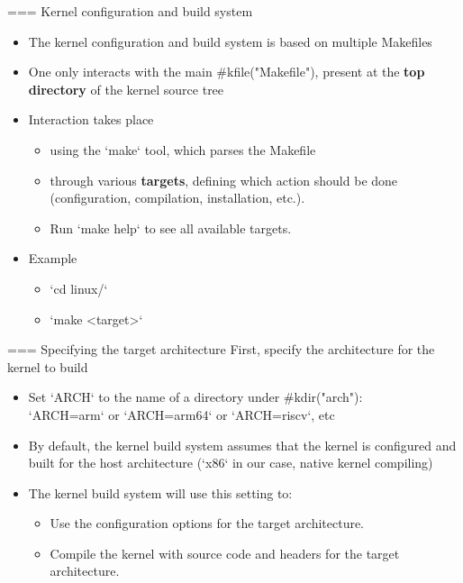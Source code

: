 === Kernel configuration and build system
  \begin{itemize}
  \item The kernel configuration and build system is based on multiple
    Makefiles
  \item One only interacts with the main #kfile("Makefile"), present at
    the {\bf top directory} of the kernel source tree
  \item Interaction takes place
    \begin{itemize}
    \item using the `make` tool, which parses the Makefile
    \item through various {\bf targets}, defining which action should
      be done (configuration, compilation, installation, etc.).
    \item Run `make help` to see all available targets.
    \end{itemize}
  \item Example
    \begin{itemize}
    \item `cd linux/`
    \item `make <target>`
    \end{itemize}
  \end{itemize}


=== Specifying the target architecture
  First, specify the architecture for the kernel to build
  \begin{itemize}
  \item Set `ARCH` to the name of a directory under #kdir("arch"):\\
	`ARCH=arm` or `ARCH=arm64` or `ARCH=riscv`, etc
  \item By default, the kernel build system assumes that the
        kernel is configured and built for the host architecture
	(`x86` in our case, native kernel compiling)
  \item The kernel build system will use this setting to:
	\begin{itemize}
	\item Use the configuration options for the target
	      architecture.
	\item Compile the kernel with source code and headers
	      for the target architecture.
	\end{itemize}
  \end{itemize}


